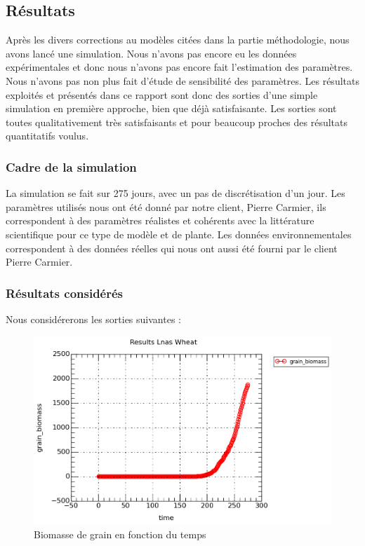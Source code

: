 \subsection{Résultats}

Après les divers corrections au modèles citées dans la partie méthodologie, nous avons lancé une simulation. 
Nous n'avons pas encore eu les données expérimentales et donc nous n'avons pas encore fait l'estimation des paramètres. Nous n'avons pas non plus fait d'étude de sensibilité des paramètres. 
Les résultats exploités et présentés dans ce rapport sont donc des sorties d'une simple simulation en première approche, bien que déjà satisfaisante. Les sorties sont toutes qualitativement très satisfaisants et pour beaucoup proches des résultats quantitatifs voulus. 

\subsubsection{Cadre de la simulation}

La simulation se fait sur 275 jours, avec un pas de discrétisation d'un jour. Les paramètres utilisés nous ont été donné par notre client, Pierre Carmier, ils correspondent à des paramètres réalistes et cohérents avec la littérature scientifique pour ce type de modèle et de plante. Les données environnementales correspondent à des données réelles qui nous ont aussi été fourni par le client Pierre Carmier.

\subsubsection{Résultats considérés}

Nous considérerons les sorties suivantes :

\begin{figure}

\begin{center}
 \includegraphics[scale = 0.2]{./img/grain.png}
 \caption{Biomasse de grain en fonction du temps}
 \label{fig:resultatGrain}
\end{center}

\end{figure}


